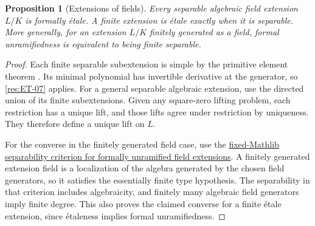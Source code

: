 \documentclass[11pt,oneside,openany]{book}
\newtheorem{proposition}[theorem]{Proposition}
\theoremstyle{definition}
\theoremstyle{remark}
\begin{document}
\begin{proposition}[Extensions of fields]\label{res:ET-10}
Every separable algebraic field extension $L/K$ is formally
\'etale. A finite extension is \'{e}tale exactly when it is
separable. More generally, for an extension $L/K$ finitely
generated as a field, formal unramifiedness is equivalent to
being finite separable.
\end{proposition}
\begin{proof}
Each finite separable subextension is simple by the primitive element
theorem \cite[Chapter 12]{d07}. Its minimal polynomial has invertible
derivative at the generator, so \ref{res:ET-07} applies. For a general
separable algebraic extension, use the directed union of its finite
subextensions. Given any square-zero lifting problem, each restriction
has a unique lift, and those lifts agree under restriction by uniqueness.
They therefore define a unique lift on $L$.

For the converse in the finitely generated field case, use the
\href{https://github.com/leanprover-community/mathlib4/blob/56a005855ea17e0b0958f73ec801ae140b0a1679/Mathlib/RingTheory/Unramified/Field.lean\#L217}
{fixed-Mathlib separability criterion for formally unramified field extensions}.
A finitely generated
extension field is a localization of the algebra generated by the
chosen field generators, so it satisfies the essentially finite type
hypothesis. The separability in that criterion includes algebraicity,
and finitely many algebraic field generators imply finite degree.
This also proves the claimed converse for a finite \'{e}tale
extension, since \'{e}taleness implies formal unramifiedness.
\end{proof}
\end{document}
